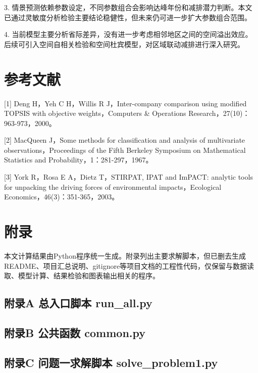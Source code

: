 \documentclass[UTF8,zihao=-4,fontset=fandol]{ctexart}
\begin{document}
3. 情景预测依赖参数设定，不同参数组合会影响达峰年份和减排潜力判断。本文已通过灵敏度分析检验主要结论稳健性，但未来仍可进一步扩大参数组合范围。

4. 当前模型主要分析省际差异，没有进一步考虑相邻地区之间的空间溢出效应。后续可引入空间自相关检验和空间杜宾模型，对区域联动减排进行深入研究。

\section*{参考文献}

[1] Deng H，Yeh C H，Willis R J，Inter-company comparison using modified TOPSIS with objective weights，Computers \& Operations Research，27(10)：963-973，2000。

[2] MacQueen J，Some methods for classification and analysis of multivariate observations，Proceedings of the Fifth Berkeley Symposium on Mathematical Statistics and Probability，1：281-297，1967。

[3] York R，Rosa E A，Dietz T，STIRPAT, IPAT and ImPACT: analytic tools for unpacking the driving forces of environmental impacts，Ecological Economics，46(3)：351-365，2003。

\clearpage
\section*{附录}

本文计算结果由Python程序统一生成。附录列出主要求解脚本，但已删去生成README、项目汇总说明、gitignore等项目文档的工程性代码，仅保留与数据读取、模型计算、结果检验和图表输出相关的程序。

\subsection*{附录A 总入口脚本 run\_all.py}

\subsection*{附录B 公共函数 common.py}

\subsection*{附录C 问题一求解脚本 solve\_problem1.py}
\end{document}
